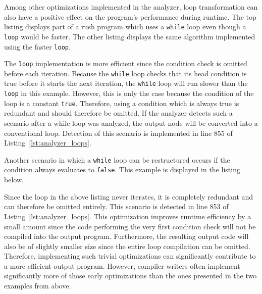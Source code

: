 Among other optimizations implemented in the analyzer, loop transformation can also have a positive effect on the program's performance during runtime.
The top listing displays part of a rush program which uses a \texttt{while} loop even though a \texttt{loop} would be faster.
The other listing displays the same algorithm implemented using the faster \texttt{loop}.


The \texttt{loop} implementation is more efficient since the condition check is omitted before each iteration.
Because the \texttt{while} loop checks that its head condition is true before it starts the next iteration,
the \texttt{while} loop will run slower than the \texttt{loop} in this example.
However, this is only the case because the condition of the loop is a constant \texttt{true}.
Therefore, using a condition which is always true is redundant and should therefore be omitted.
If the analyzer detects such a scenario after a while-loop was analyzed, the output node will be converted into a conventional loop.
Detection of this scenario is implemented in line 855 of Listing~\ref{lst:analyzer_loops}.


Another scenario in which a \texttt{while} loop can be restructured occurs if the condition always evaluates to \texttt{false}.
This example is displayed in the listing below.


Since the loop in the above listing never iterates, it is completely redundant and can therefore be omitted entirely.
This scenario is detected in line 853 of Listing~\ref{lst:analyzer_loops}.
This optimization improves runtime efficiency by a small amount since the code performing the very first condition check will not be compiled into the output program.
Furthermore, the resulting output code will also be of slightly smaller size since the entire loop compilation can be omitted.
Therefore, implementing such trivial optimizations can significantly contribute to a more efficient output program.
However, compiler writers often implement significantly more of those early optimizations than the ones presented in the two examples from above.

